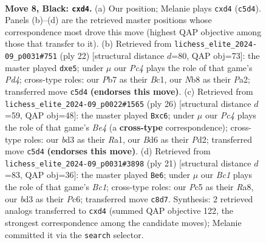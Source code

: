 \documentclass[11pt]{article}
\begin{document}
\begin{figure}[p]\centering
\begin{subfigure}{0.46\textwidth}\centering
\resizebox{\linewidth}{!}{%
\newchessgame
\chessboard[
  setfen={rnbqr1k1/pp3ppp/3bpn2/2pp2B1/3P4/3BPN2/PPP2PPP/RN1QK2R b KQ - 3 8},
  showmover=false,
  pgfstyle=straightmove, color=movearrow, markmove={c5-d4}
]}
\caption{}
\end{subfigure}\hfill
\begin{subfigure}{0.46\textwidth}\centering
\resizebox{\linewidth}{!}{%
\newchessgame
\chessboard[
  setfen={r2k3r/ppqn1Bpp/2pb1n2/4p3/2NPP1b1/2P2N2/PP4PP/R1BQ1RK1 w - - 7 12},
  showmover=false,
  pgfstyle=straightmove, color=movearrow, markmove={d4-e5}
]}
\caption{}
\end{subfigure}
\\[4pt]
\begin{subfigure}{0.46\textwidth}\centering
\resizebox{\linewidth}{!}{%
\newchessgame
\chessboard[
  setfen={r3kb1r/pp1q2pp/1nn1p3/1N3p1b/2p1B3/2P2N1P/PP1P1PP1/R1BQ1RK1 w kq - 2 14},
  showmover=false,
  pgfstyle=straightmove, color=movearrow, markmove={e4-c6}
]}
\caption{}
\end{subfigure}\hfill
\begin{subfigure}{0.46\textwidth}\centering
\resizebox{\linewidth}{!}{%
\newchessgame
\chessboard[
  setfen={rnbqr1k1/1p3pp1/p1pb1n1p/3p4/3P3B/P1NBP3/1PQ1NPPP/R3K2R b KQ - 0 11},
  showmover=false,
  pgfstyle=straightmove, color=movearrow, markmove={c8-e6}
]}
\caption{}
\end{subfigure}
\caption{\textbf{Move 8, Black: \texttt{cxd4}.} (a) Our position; Melanie plays \texttt{cxd4} (\texttt{c5d4}). Panels (b)--(d) are the retrieved master positions whose correspondence most drove this move (highest QAP objective among those that transfer to it). (b) Retrieved from \texttt{lichess\_elite\_2024-09\_p0031\#751} (ply 22) [structural distance $d$=80, QAP obj=73]: the master played \texttt{dxe5}; under $\mu$ our \emph{Pc4} plays the role of that game's \emph{Pd4}; cross-type roles: our \emph{P}b7 as their \emph{B}c1, our \emph{N}b8 as their \emph{P}a2; transferred move \texttt{c5d4} \textbf{(endorses this move)}. (c) Retrieved from \texttt{lichess\_elite\_2024-09\_p0022\#1565} (ply 26) [structural distance $d$=59, QAP obj=48]: the master played \texttt{Bxc6}; under $\mu$ our \emph{Pc4} plays the role of that game's \emph{Be4} (a \textbf{cross-type} correspondence); cross-type roles: our \emph{b}d3 as their \emph{R}a1, our \emph{B}d6 as their \emph{P}d2; transferred move \texttt{c5d4} \textbf{(endorses this move)}. (d) Retrieved from \texttt{lichess\_elite\_2024-09\_p0031\#3898} (ply 21) [structural distance $d$=83, QAP obj=36]: the master played \texttt{Be6}; under $\mu$ our \emph{Bc1} plays the role of that game's \emph{Bc1}; cross-type roles: our \emph{P}c5 as their \emph{R}a8, our \emph{b}d3 as their \emph{P}c6; transferred move \texttt{c8d7}. Synthesis: 2 retrieved analogs transferred to \texttt{cxd4} (summed QAP objective 122, the strongest correspondence among the candidate moves); Melanie committed it via the \texttt{search} selector.}
\label{fig:thought-m15}
\end{figure}
\end{document}
